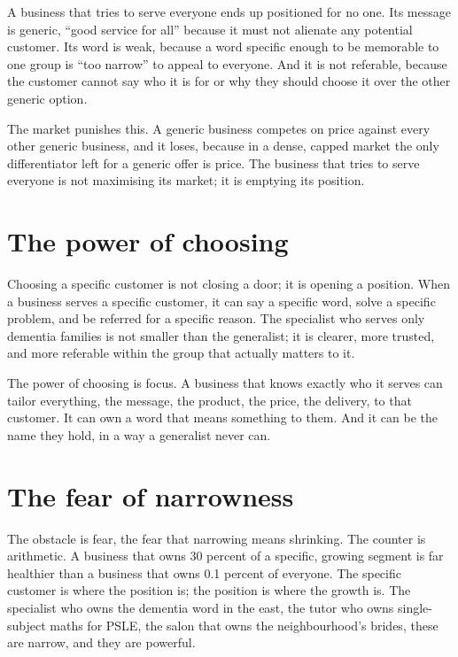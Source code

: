 \documentclass[10pt,twoside,openany]{memoir}
\newcommand{\needspacehead}{\needspace{4\baselineskip}}
\let\oldsection\section
\renewcommand{\section}{\needspacehead\oldsection}
\begin{document}
A business that tries to serve everyone ends up positioned for no one.
Its message is generic, ``good service for all'' because it must not
alienate any potential customer. Its word is weak, because a word
specific enough to be memorable to one group is ``too narrow'' to appeal
to everyone. And it is not referable, because the customer cannot say
who it is for or why they should choose it over the other generic
option.

The market punishes this. A generic business competes on price against
every other generic business, and it loses, because in a dense, capped
market the only differentiator left for a generic offer is price. The
business that tries to serve everyone is not maximising its market; it
is emptying its position.

\section{The power of choosing}\label{the-power-of-choosing}

Choosing a specific customer is not closing a door; it is opening a
position. When a business serves a specific customer, it can say a
specific word, solve a specific problem, and be referred for a specific
reason. The specialist who serves only dementia families is not smaller
than the generalist; it is clearer, more trusted, and more referable
within the group that actually matters to it.

The power of choosing is focus. A business that knows exactly who it
serves can tailor everything, the message, the product, the price, the
delivery, to that customer. It can own a word that means something to
them. And it can be the name they hold, in a way a generalist never can.

\section{The fear of narrowness}\label{the-fear-of-narrowness}

The obstacle is fear, the fear that narrowing means shrinking. The
counter is arithmetic. A business that owns 30 percent of a specific,
growing segment is far healthier than a business that owns 0.1 percent
of everyone. The specific customer is where the position is; the
position is where the growth is. The specialist who owns the dementia
word in the east, the tutor who owns single-subject maths for PSLE, the
salon that owns the neighbourhood's brides, these are narrow, and they
are powerful.
\end{document}
